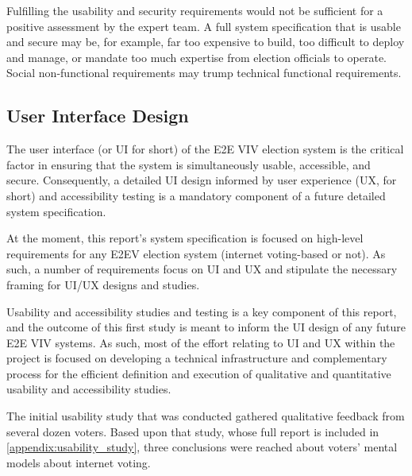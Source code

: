 Fulfilling the usability and security requirements would not be
sufficient for a positive assessment by the expert team. A full system
specification that is usable and secure may be, for example, far too
expensive to build, too difficult to deploy and manage, or mandate too
much expertise from election officials to operate. Social
non-functional requirements may trump technical functional
requirements.

\subsection{User Interface Design}
\label{sec:user-interf-design}

The user interface (or UI for short) of the E2E VIV election system is
the critical factor in ensuring that the system is simultaneously
usable, accessible, and secure. Consequently, a detailed UI design
informed by user experience (UX, for short) and accessibility testing
is a mandatory component of a future detailed system specification.

At the moment, this report's system specification is focused on
high-level requirements for any E2EV election system (internet
voting-based or not).  As such, a number of requirements focus on UI
and UX and stipulate the necessary framing for UI/UX designs and
studies.

Usability and accessibility studies and testing is a key component of
this report, and the outcome of this first study is meant to inform
the UI design of any future E2E VIV systems. As such, most of the
effort relating to UI and UX within the project is focused on
developing a technical infrastructure and complementary process for
the efficient definition and execution of qualitative and quantitative
usability and accessibility studies.

The initial usability study that was conducted gathered qualitative
feedback from several dozen voters.  Based upon that study, whose full
report is included in \autoref{appendix:usability_study}, three
conclusions were reached about voters' mental models about internet
voting.


